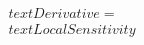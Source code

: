 \documentclass[preview]{standalone}
\begin{document}
\begin{align*}
\quad\\text{Derivative} = \quad\\text{Local Sensitivity}
\end{align*}
\end{document}
